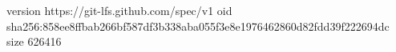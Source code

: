 version https://git-lfs.github.com/spec/v1
oid sha256:858ee8ffbab266bf587df3b338aba055f3e8e1976462860d82fdd39f222694dc
size 626416
